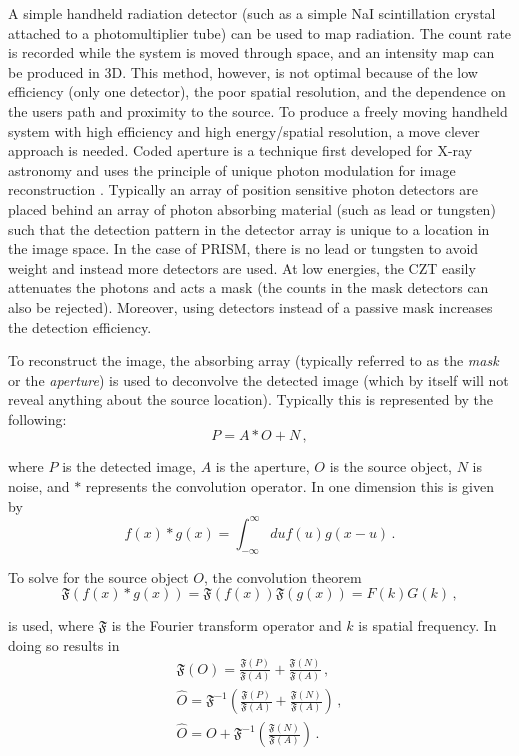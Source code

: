 \documentclass[10pt]{article}
\begin{document}
A simple handheld radiation detector (such as a simple NaI scintillation crystal attached to a photomultiplier tube) can be used to map radiation. The count rate is recorded while the system is moved through space, and an intensity map can be produced in 3D. This method, however, is not optimal because of the low efficiency (only one detector), the poor spatial resolution, and the dependence on the users path and proximity to the source. To produce a freely moving handheld system with high efficiency and high energy/spatial resolution, a move clever approach is needed. Coded aperture is a technique first developed for X-ray astronomy and uses the principle of unique photon modulation for image reconstruction \cite{FenimoreCannon1978}. Typically an array of position sensitive photon detectors are placed behind an array of photon absorbing material (such as lead or tungsten) such that the detection pattern in the detector array is unique to a location in the image space. In the case of PRISM, there is no lead or tungsten to avoid weight and instead more detectors are used. At low energies, the CZT easily attenuates the photons and acts a mask (the counts in the mask detectors can also be rejected). Moreover, using detectors instead of a passive mask increases the detection efficiency.

To reconstruct the image, the absorbing array (typically referred to as the \emph{mask} or the \emph{aperture}) is used to deconvolve the detected image (which by itself will not reveal anything about the source location). Typically this is represented by the following:
%
\begin{equation}
	P = A \ast O + N\,,
\end{equation}

\noindent where $P$ is the detected image, $A$ is the aperture, $O$ is the source object, $N$ is noise, and $\ast$ represents the convolution operator. In one dimension this is given by
%
\begin{equation}
	f(x) \ast g(x) = \int_{-\infty}^\infty du f(u)g(x-u)\,.
\end{equation}

\noindent To solve for the source object $O$, the convolution theorem
%
\begin{equation}
	\mathfrak{F}(f(x) \ast g(x)) = \mathfrak{F}(f(x)) \mathfrak{F}(g(x)) = F(k)G(k)\,,
\end{equation}

\noindent is used, where $\mathfrak{F}$ is the Fourier transform operator and $k$ is spatial frequency. In doing so results in
%
\begin{align}
	\mathfrak{F}(O) = \frac{\mathfrak{F}(P)}{\mathfrak{F}(A)} + \frac{\mathfrak{F}(N)}{\mathfrak{F}(A)}\,,  \\
	\hat{O} = \mathfrak{F}^{-1}\left(\frac{\mathfrak{F}(P)}{\mathfrak{F}(A)} + \frac{\mathfrak{F}(N)}{\mathfrak{F}(A)}\right)\,, \\
	\hat{O} = O + \mathfrak{F}^{-1}\left( \frac{\mathfrak{F}(N)}{\mathfrak{F}(A)}\right)\,.
\end{align}
\end{document}
